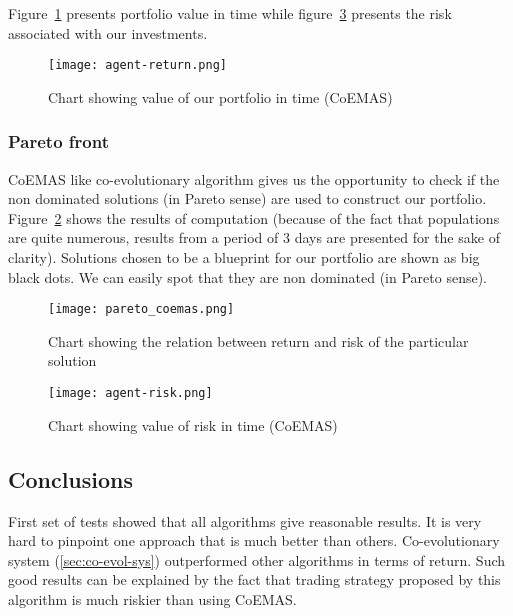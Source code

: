 Figure~\ref{fig:agent_return} presents portfolio value in time while  figure~\ref{fig:agent_risk} presents the risk associated with our investments.

\begin{figure}[ht]
  \begin{center}
    \texttt{[image: agent-return.png]}
  \end{center}
  \caption{Chart showing value of our portfolio in time (CoEMAS)}
  \label{fig:agent_return}
\end{figure}

\subsubsection{Pareto front}

CoEMAS like co-evolutionary algorithm gives us the opportunity to check if the non dominated solutions (in Pareto sense) are used to construct our portfolio.
Figure~\ref{fig:pareto_coemas} shows the results of computation (because of the fact that populations are quite numerous,
 results from a period of 3 days are presented for the sake of clarity). 
Solutions chosen to be a blueprint for our portfolio are shown as big black dots.
We can easily spot that they are non dominated (in Pareto sense). 


\begin{figure}[ht]
  \begin{center}
    \texttt{[image: pareto\_coemas.png]}
  \end{center}
  \caption{Chart showing the relation between return and risk of the particular solution}
  \label{fig:pareto_coemas}
\end{figure}

\begin{figure}[ht]
  \begin{center}
    \texttt{[image: agent-risk.png]}
  \end{center}
  \caption{Chart showing value of risk in time (CoEMAS)}
  \label{fig:agent_risk}
\end{figure}

\subsection{Conclusions}

First set of tests showed that all algorithms give reasonable results.
It is very hard to pinpoint one approach that is much better than others.
Co-evolutionary system (\ref{sec:co-evol-sys}) outperformed other algorithms in terms of return.
Such good results can be explained by the fact that trading strategy proposed by this algorithm is much riskier than using CoEMAS.
  
